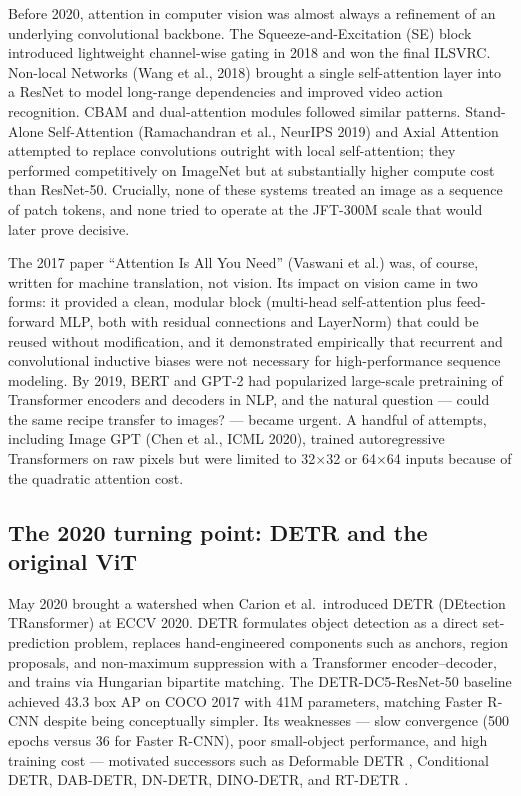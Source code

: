 \documentclass{article}
\begin{document}
Before 2020, attention in computer vision was almost always a refinement of an underlying convolutional backbone. The Squeeze-and-Excitation (SE) block introduced lightweight channel-wise gating in 2018 and won the final ILSVRC. Non-local Networks (Wang et al., 2018) brought a single self-attention layer into a ResNet to model long-range dependencies and improved video action recognition. CBAM and dual-attention modules followed similar patterns. Stand-Alone Self-Attention (Ramachandran et al., NeurIPS 2019) and Axial Attention \citep{wang2021pyramidvisiontrans} attempted to replace convolutions outright with local self-attention; they performed competitively on ImageNet but at substantially higher compute cost than ResNet-50. Crucially, none of these systems treated an image as a sequence of patch tokens, and none tried to operate at the JFT-300M scale that would later prove decisive.

The 2017 paper ``Attention Is All You Need'' (Vaswani et al.) was, of course, written for machine translation, not vision. Its impact on vision came in two forms: it provided a clean, modular block (multi-head self-attention plus feed-forward MLP, both with residual connections and LayerNorm) that could be reused without modification, and it demonstrated empirically that recurrent and convolutional inductive biases were not necessary for high-performance sequence modeling. By 2019, BERT and GPT-2 had popularized large-scale pretraining of Transformer encoders and decoders in NLP, and the natural question --- could the same recipe transfer to images? --- became urgent. A handful of attempts, including Image GPT (Chen et al., ICML 2020), trained autoregressive Transformers on raw pixels but were limited to 32×32 or 64×64 inputs because of the quadratic attention cost.

\subsection{The 2020 turning point: DETR and the original ViT}\label{the-2020-turning-point-detr-and-the-original-vit}

May 2020 brought a watershed when Carion et al.~introduced DETR (DEtection TRansformer) at ECCV 2020. DETR formulates object detection as a direct set-prediction problem, replaces hand-engineered components such as anchors, region proposals, and non-maximum suppression with a Transformer encoder--decoder, and trains via Hungarian bipartite matching. The DETR-DC5-ResNet-50 baseline achieved 43.3 box AP on COCO 2017 with 41M parameters, matching Faster R-CNN despite being conceptually simpler. Its weaknesses --- slow convergence (500 epochs versus 36 for Faster R-CNN), poor small-object performance, and high training cost --- motivated successors such as Deformable DETR \citep{zhu2021deformabledetrdefo}, Conditional DETR, DAB-DETR, DN-DETR, DINO-DETR, and RT-DETR \citep{zhao2024detrsbeatyolosonre}.
\end{document}
